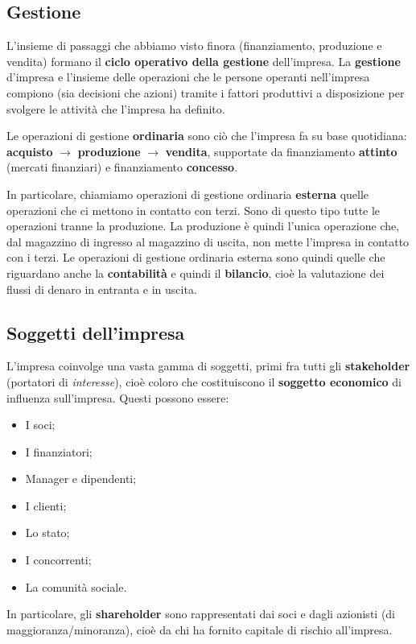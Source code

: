 \documentclass[a4paper,11pt]{article}
\begin{document}
\subsection{Gestione}
L'insieme di passaggi che abbiamo visto finora (finanziamento, produzione e vendita) formano il \textbf{ciclo operativo della gestione} dell'impresa.
La \textbf{gestione} d'impresa e l'insieme delle operazioni che le persone operanti nell'impresa compiono (sia decisioni che azioni) tramite i fattori produttivi a disposizione per svolgere le attività che l'impresa ha definito.

Le operazioni di gestione \textbf{ordinaria} sono ciò che l'impresa fa su base quotidiana: \textbf{acquisto} $\rightarrow$ \textbf{produzione} $\rightarrow$ \textbf{vendita}, supportate da finanziamento \textbf{attinto} (mercati finanziari) e finanziamento \textbf{concesso}.

In particolare, chiamiamo operazioni di gestione ordinaria \textbf{esterna} quelle operazioni che ci mettono in contatto con terzi.
Sono di questo tipo tutte le operazioni tranne la produzione.
La produzione è quindi l'unica operazione che, dal magazzino di ingresso al magazzino di uscita, non mette l'impresa in contatto con i terzi.
Le operazioni di gestione ordinaria esterna sono quindi quelle che riguardano anche la \textbf{contabilità} e quindi il \textbf{bilancio}, cioè la valutazione dei flussi di denaro in entranta e in uscita.

\subsection{Soggetti dell'impresa}
	L'impresa coinvolge una vasta gamma di soggetti, primi fra tutti gli \textbf{stakeholder} (portatori di \textit{interesse}), cioè coloro che costituiscono il \textbf{soggetto economico} di influenza sull'impresa.
Questi possono essere:
\begin{itemize}
	\item I soci;
	\item I finanziatori;
	\item Manager e dipendenti;
	\item I clienti;
	\item Lo stato;
	\item I concorrenti;
	\item La comunità sociale.
\end{itemize}

In particolare, gli \textbf{shareholder} sono rappresentati dai soci e dagli azionisti (di maggioranza/minoranza), cioè da chi ha fornito capitale di rischio all'impresa.
\end{document}
